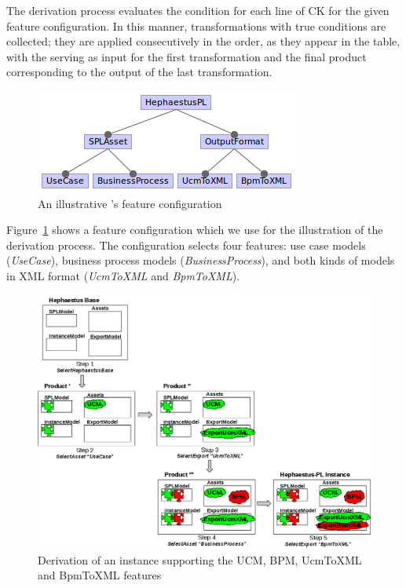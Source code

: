 
The derivation process evaluates the condition for each line of CK for the given feature configuration. 
In this manner, transformations with true conditions are collected; they are applied consecutively in the order, as they appear in the table, with the \emptyi{} serving as input for the first transformation and the final product corresponding to the output of the last transformation. 


\begin{figure}[t!]
\begin{center}
\includegraphics[scale=0.8]{imagens/fc-ucm-bpm.png}
\end{center}
\caption{An illustrative \hpl's feature configuration}
\label{fig:fc-ucm-bpm}
\end{figure}


Figure~\ref{fig:fc-ucm-bpm} shows a feature configuration which we use for the illustration of the derivation process. The configuration selects four features: use case models (\emph{UseCase}), business process models (\emph{BusinessProcess}), and both kinds of models in XML format (\emph{UcmToXML} and \emph{BpmToXML}).


\begin{figure}[t!]
\begin{center}
\includegraphics[width=\textwidth]{imagens/derivation.png}
\end{center}
\caption{Derivation of an \hpl{} instance supporting the UCM, BPM, UcmToXML and BpmToXML features}
\label{fig:hpl-derivation}
\end{figure}

